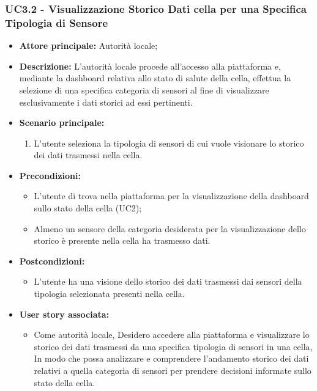 \subsubsection{UC3.2 - Visualizzazione Storico Dati cella per una Specifica Tipologia di Sensore}
\begin{itemize}
    \item \textbf{Attore principale:} Autorità locale;
    \item \textbf{Descrizione:} L’autorità locale procede all’accesso alla piattaforma e, mediante la
          dashboard relativa allo stato di salute della cella, effettua la selezione di una specifica
          categoria di sensori al fine di visualizzare esclusivamente i dati storici ad essi pertinenti.
    \item \textbf{Scenario principale:}
          \begin{enumerate}
              \item L'utente seleziona la tipologia di sensori di cui vuole visionare lo storico dei dati trasmessi nella cella.
          \end{enumerate}
    \item \textbf{Precondizioni:}
          \begin{itemize}
              \item L'utente di trova nella piattaforma per la visualizzazione della dashboard sullo stato della cella (UC2);
              \item  Almeno un sensore della categoria desiderata per la visualizzazione dello storico è presente nella cella ha trasmesso dati.
          \end{itemize}
    \item \textbf{Postcondizioni:}
          \begin{itemize}
              \item  L'utente ha una visione dello storico dei dati trasmessi dai sensori della tipologia selezionata presenti nella cella.
          \end{itemize}
    \item \textbf{User story associata:}
          \begin{itemize}
              \item Come autorità locale,
                    Desidero accedere alla piattaforma e visualizzare lo storico dei dati trasmessi da una specifica tipologia di sensori in una cella,
                    In modo che possa analizzare e comprendere l'andamento storico dei dati relativi a quella categoria di sensori per prendere decisioni informate sullo stato della cella.
          \end{itemize}
\end{itemize}